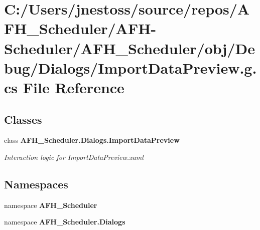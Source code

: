 \section{C\+:/\+Users/jnestoss/source/repos/\+A\+F\+H\+\_\+\+Scheduler/\+A\+F\+H-\/\+Scheduler/\+A\+F\+H\+\_\+\+Scheduler/obj/\+Debug/\+Dialogs/\+Import\+Data\+Preview.g.\+cs File Reference}
\label{_debug_2_dialogs_2_import_data_preview_8g_8cs}
\subsection*{Classes}
\begin{DoxyCompactItemize}
\item 
class \textbf{ A\+F\+H\+\_\+\+Scheduler.\+Dialogs.\+Import\+Data\+Preview}
\begin{DoxyCompactList}\small\item\em Interaction logic for Import\+Data\+Preview.\+xaml \end{DoxyCompactList}\end{DoxyCompactItemize}
\subsection*{Namespaces}
\begin{DoxyCompactItemize}
\item 
namespace \textbf{ A\+F\+H\+\_\+\+Scheduler}
\item 
namespace \textbf{ A\+F\+H\+\_\+\+Scheduler.\+Dialogs}
\end{DoxyCompactItemize}
